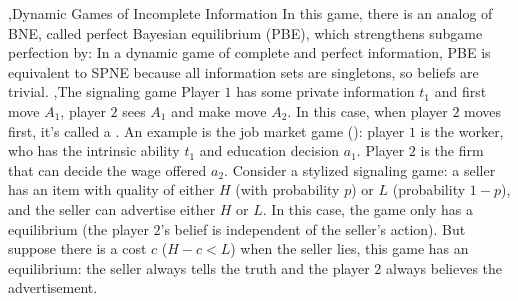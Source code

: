 \documentclass[10pt]{report}
\begin{document}
\sep{Dynamic Games of Incomplete Information}
In this game, there is an analog of BNE, called perfect Bayesian equilibrium (PBE), which strengthens subgame perfection by:
In a dynamic game of complete and perfect information, PBE is equivalent to SPNE because all information sets are singletons, so beliefs are trivial. 
\sep{The signaling game}
Player $1$ has some private information $t_1$ and first move $A_1$, player $2$ sees $A_1$ and make move $A_2$. In this case, when player $2$ moves first, it's called a . 
An example is the job market game (\cite{Spence1973}): player $1$ is the worker, who has the intrinsic ability $t_1$ and education decision $a_1$. Player $2$ is the firm that can decide the wage offered $a_2$.
Consider a stylized signaling game: a seller has an item with quality of either $H$ (with probability $p$) or $L$ (probability $1-p$), and the seller can advertise either $H$ or $L$. In this case, the game only has a 
 equilibrium (the player $2$'s belief is independent of the seller's action). But suppose there is a cost $c$ ($H-c<L$) when the seller lies, this game has an  equilibrium: the seller 
always tells the truth and the player $2$ always believes the advertisement.
\end{document}
